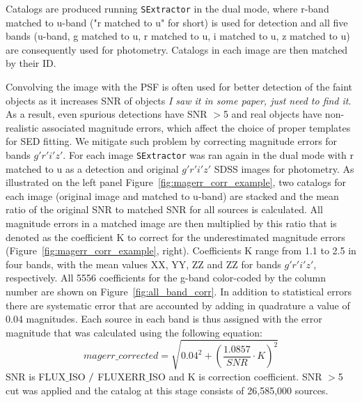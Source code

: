 \documentclass[apj,iop]{emulateapj}
\begin{document}
Catalogs are produced running {\tt SExtractor} in the dual mode, where r-band matched to u-band ("r matched to u" for short) is used for detection and all five bands (u-band, g matched to u, r matched to u, i matched to u, z matched to u) are consequently used for photometry. Catalogs in each image are then matched by their ID.

Convolving the image with the PSF is often used for better detection of the faint objects as it increases SNR of objects \textit{I saw it in some paper, just need to find it}. As a result, even spurious detections have SNR $>$5 and real objects have non-realistic associated magnitude errors, which affect the choice of proper templates for SED fitting. We mitigate such problem by correcting magnitude errors for bands $g'r'i'z'$. For each image {\tt SExtractor} was ran again in the dual mode with r matched to u as a detection and original $g'r'i'z'$ SDSS images for photometry. As illustrated on the left panel Figure~\ref{fig:magerr_corr_example}, two catalogs for each image (original image and matched to u-band) are stacked and the mean ratio of the original SNR to matched SNR for all sources is calculated. All magnitude errors in a matched image are then multiplied by this ratio that is denoted as the coefficient K to correct for the underestimated magnitude errors (Figure~\ref{fig:magerr_corr_example}, right). Coefficients K range from 1.1 to 2.5 in four bands, with the mean values XX, YY, ZZ and ZZ for bands $g'r'i'z'$, respectively. All 5556 coefficients for the g-band color-coded by the column number are shown  on Figure~\ref{fig:all_band_corr}. In addition to statistical errors there are systematic error that are accounted by adding in quadrature a value of 0.04 magnitudes. Each source in each band is thus assigned with the error magnitude that was calculated using the following equation:
$$ magerr\_corrected = \sqrt{0.04^{2}+(\dfrac{1.0857}{SNR}\cdot K)^{2}} $$ SNR is FLUX$\_$ISO $ \//$ FLUXERR$\_$ISO and K is correction coefficient. SNR $>$5 cut was applied and the catalog at this stage consists of 26,585,000 sources. 
\end{document}
